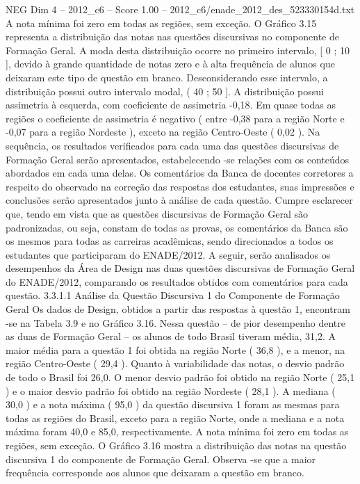 \begin{textsample}{NEG Dim 4 – 2012\_c6 – Score 1.00 – 2012\_c6/enade\_2012\_des\_523330154d.txt}
A nota mínima foi zero em todas as regiões, sem exceção.
O Gráfico 3.15 representa a distribuição das notas nas questões discursivas no componente de Formação Geral.
A moda desta distribuição ocorre no primeiro intervalo, [ 0 ; 10 ], devido à grande quantidade de notas zero e à alta frequência de alunos que deixaram este tipo de questão em branco.
Desconsiderando esse intervalo, a distribuição possui outro intervalo modal, ( 40 ; 50 ].
A distribuição possui assimetria à esquerda, com coeficiente de assimetria -0,18.
Em quase todas as regiões o coeficiente de assimetria é negativo ( entre -0,38 para a região Norte e -0,07 para a região Nordeste ), exceto na região Centro-Oeste ( 0,02 ).
Na sequência, os resultados verificados para cada uma das questões discursivas de Formação Geral serão apresentados, estabelecendo -se relações com os conteúdos abordados em cada uma delas.
Os comentários da Banca de docentes corretores a respeito do observado na correção das respostas dos estudantes, suas impressões e conclusões serão apresentados junto à análise de cada questão.
Cumpre esclarecer que, tendo em vista que as questões discursivas de Formação Geral são padronizadas, ou seja, constam de todas as provas, os comentários da Banca são os mesmos para todas as carreiras acadêmicas, sendo direcionados a todos os estudantes que participaram do ENADE/2012.
A seguir, serão analisados os desempenhos da Área de Design nas duas questões discursivas de Formação Geral do ENADE/2012, comparando os resultados obtidos com comentários para cada questão. 3.3.1.1 Análise da Questão Discursiva 1 do Componente de Formação Geral Os dados de Design, obtidos a partir das respostas à questão 1, encontram -se na Tabela 3.9 e no Gráfico 3.16.
Nessa questão – de pior desempenho dentre as duas de Formação Geral – os alunos de todo Brasil tiveram média, 31,2.
A maior média para a questão 1 foi obtida na região Norte ( 36,8 ), e a menor, na região Centro-Oeste ( 29,4 ).
Quanto à variabilidade das notas, o desvio padrão de todo o Brasil foi 26,0.
O menor desvio padrão foi obtido na região Norte ( 25,1 ) e o maior desvio padrão foi obtido na região Nordeste ( 28,1 ).
A mediana ( 30,0 ) e a nota máxima ( 95,0 ) da questão discursiva 1 foram as mesmas para todas as regiões do Brasil, exceto para a região Norte, onde a mediana e a nota máxima foram 40,0 e 85,0, respectivamente.
A nota mínima foi zero em todas as regiões, sem exceção.
O Gráfico 3.16 mostra a distribuição das notas na questão discursiva 1 do componente de Formação Geral.
Observa -se que a maior frequência corresponde aos alunos que deixaram a questão em branco.

\end{textsample}
